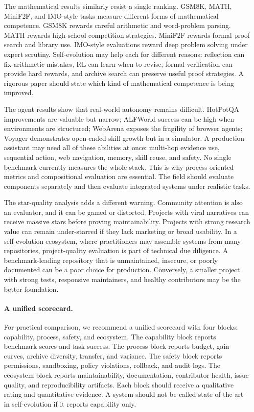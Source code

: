 The mathematical results similarly resist a single ranking. GSM8K, MATH, MiniF2F, and IMO-style tasks measure different forms of mathematical competence. GSM8K rewards careful arithmetic and word-problem parsing. MATH rewards high-school competition strategies. MiniF2F rewards formal proof search and library use. IMO-style evaluations reward deep problem solving under expert scrutiny. Self-evolution may help each for different reasons: reflection can fix arithmetic mistakes, RL can learn when to revise, formal verification can provide hard rewards, and archive search can preserve useful proof strategies. A rigorous paper should state which kind of mathematical competence is being improved.

The agent results show that real-world autonomy remains difficult. HotPotQA improvements are valuable but narrow; ALFWorld success can be high when environments are structured; WebArena exposes the fragility of browser agents; Voyager demonstrates open-ended skill growth but in a simulator. A production assistant may need all of these abilities at once: multi-hop evidence use, sequential action, web navigation, memory, skill reuse, and safety. No single benchmark currently measures the whole stack. This is why process-oriented metrics and compositional evaluation are essential. The field should evaluate components separately and then evaluate integrated systems under realistic tasks.

The star-quality analysis adds a different warning. Community attention is also an evaluator, and it can be gamed or distorted. Projects with viral narratives can receive massive stars before proving maintainability. Projects with strong research value can remain under-starred if they lack marketing or broad usability. In a self-evolution ecosystem, where practitioners may assemble systems from many repositories, project-quality evaluation is part of technical due diligence. A benchmark-leading repository that is unmaintained, insecure, or poorly documented can be a poor choice for production. Conversely, a smaller project with strong tests, responsive maintainers, and healthy contributors may be the better foundation.

\paragraph{A unified scorecard.}
For practical comparison, we recommend a unified scorecard with four blocks: capability, process, safety, and ecosystem. The capability block reports benchmark scores and task success. The process block reports budget, gain curves, archive diversity, transfer, and variance. The safety block reports permissions, sandboxing, policy violations, rollback, and audit logs. The ecosystem block reports maintainability, documentation, contributor health, issue quality, and reproducibility artifacts. Each block should receive a qualitative rating and quantitative evidence. A system should not be called state of the art in self-evolution if it reports capability only.

